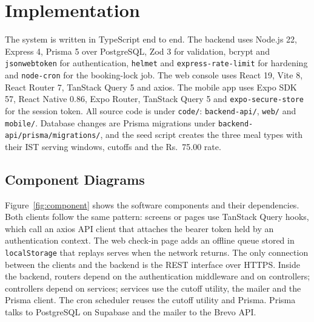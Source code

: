 \documentclass[11pt,a4paper]{article}
\begin{document}
\clearpage
\section{Implementation}

The system is written in TypeScript end to end. The backend uses Node.js 22,
Express 4, Prisma 5 over PostgreSQL, Zod 3 for validation, bcrypt and
\texttt{jsonwebtoken} for authentication, \texttt{helmet} and
\texttt{express-rate-limit} for hardening and \texttt{node-cron} for the
booking-lock job. The web console uses React 19, Vite 8, React Router 7,
TanStack Query 5 and axios. The mobile app uses Expo SDK 57, React Native 0.86,
Expo Router, TanStack Query 5 and \texttt{expo-secure-store} for the session
token. All source code is under \texttt{code/}: \texttt{backend-api/},
\texttt{web/} and \texttt{mobile/}. Database changes are Prisma migrations
under \texttt{backend-api/prisma/migrations/}, and the seed script creates the
three meal types with their IST serving windows, cutoffs and the Rs.~75.00
rate.

\subsection{Component Diagrams}

Figure~\ref{fig:component} shows the software components and their
dependencies. Both clients follow the same pattern: screens or pages use
TanStack Query hooks, which call an axios API client that attaches the bearer
token held by an authentication context. The web check-in page adds an offline
queue stored in \texttt{localStorage} that replays serves when the network
returns. The only connection between the clients and the backend is the REST
interface over HTTPS. Inside the backend, routers depend on the authentication
middleware and on controllers; controllers depend on services; services use the
cutoff utility, the mailer and the Prisma client. The cron scheduler reuses the
cutoff utility and Prisma. Prisma talks to PostgreSQL on Supabase and the mailer
to the Brevo API.
\end{document}

